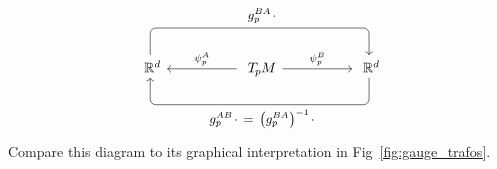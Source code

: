 \vspace*{-1ex}
\begin{equation}\label{eq:commutative_diagram_TpM}
\begin{tikzcd}[column sep=50pt, row sep=5pt, font=\normalsize]
    \R^d
        \arrow[rr, rounded corners, to path={ 
                -- ([yshift=4.5ex]\tikztostart.north) 
                --node[above, pos=.5]{\small$g_p^{BA} \mkern2mu\cdot$} ([yshift=4.5ex]\tikztotarget.north) 
                -- (\tikztotarget.north)
                }]
    & \TpM
        \arrow[l, "\psi_p^A"']
        \arrow[r, "\psi_p^B"]
    & \R^d
        \arrow[ll, rounded corners, to path={ 
                -- ([yshift=-4.5ex]\tikztostart.south) 
                --node[below, pos=.5]{\small$g_p^{AB} \mkern2mu\cdot \,=\, \big( g_p^{BA} \big)^{-1} \mkern2mu\cdot$} ([yshift=-4.5ex]\tikztotarget.south) 
                -- (\tikztotarget.south)
                }]
\end{tikzcd}
\vspace*{-1ex}%
\end{equation}
Compare this diagram to its graphical interpretation in Fig~\ref{fig:gauge_trafos}.


